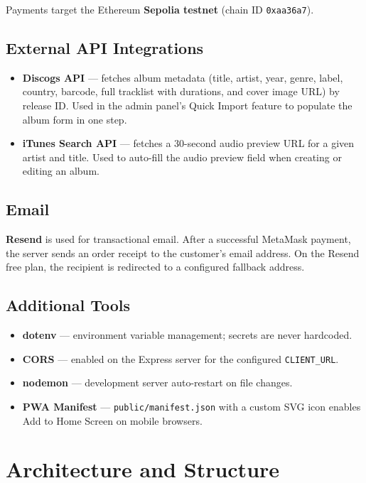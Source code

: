 \documentclass[11pt, a4paper]{report}
\begin{document}
Payments target the Ethereum \textbf{Sepolia testnet} (chain ID \texttt{0xaa36a7}).

\section{External API Integrations}

\begin{itemize}
  \item \textbf{Discogs API} — fetches album metadata (title, artist, year, genre, label, country, barcode, full tracklist with durations, and cover image URL) by release ID. Used in the admin panel's Quick Import feature to populate the album form in one step.
  \item \textbf{iTunes Search API} — fetches a 30-second audio preview URL for a given artist and title. Used to auto-fill the audio preview field when creating or editing an album.
\end{itemize}

\section{Email}

\textbf{Resend} is used for transactional email. After a successful MetaMask payment, the server sends an order receipt to the customer's email address. On the Resend free plan, the recipient is redirected to a configured fallback address.

\section{Additional Tools}

\begin{itemize}
  \item \textbf{dotenv} — environment variable management; secrets are never hardcoded.
  \item \textbf{CORS} — enabled on the Express server for the configured \texttt{CLIENT\_URL}.
  \item \textbf{nodemon} — development server auto-restart on file changes.
  \item \textbf{PWA Manifest} — \texttt{public/manifest.json} with a custom SVG icon enables Add to Home Screen on mobile browsers.
\end{itemize}

\chapter{Architecture and Structure}
\end{document}
